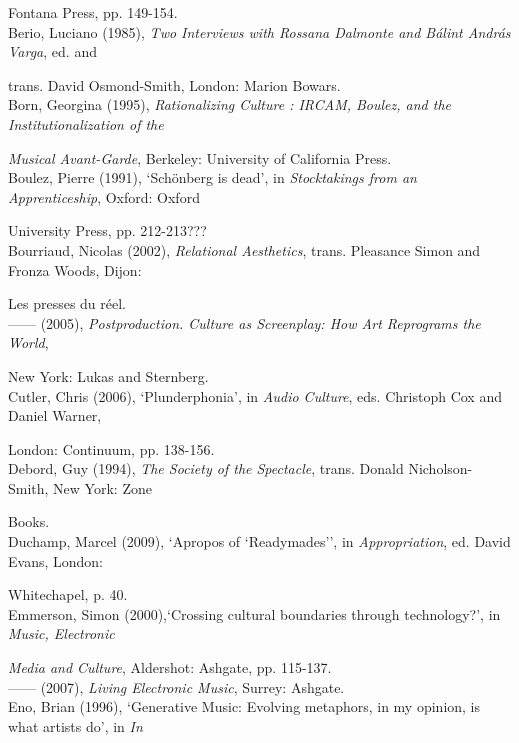 Fontana Press, pp. 149-154. 
\hypertarget{berio}{}\\
Berio, Luciano (1985), \emph{Two Interviews with Rossana Dalmonte and B\'{a}lint Andr\'{a}s Varga},  ed. and 

trans. David Osmond-Smith, London: Marion Bowars. 
\hypertarget{born}{}\\
Born, Georgina (1995), \emph{Rationalizing Culture : IRCAM, Boulez, and the Institutionalization of the}

\emph{Musical Avant-Garde}, Berkeley: University of California Press. 
\hypertarget{boulez}{}\\
Boulez, Pierre (1991), `Sch\"{o}nberg is dead', in \emph{Stocktakings from an Apprenticeship}, Oxford: Oxford 

University Press, pp. 212-213??? 
\hypertarget{relational}{}\\
Bourriaud, Nicolas (2002), \emph{Relational Aesthetics}, trans. Pleasance Simon and Fronza Woods, Dijon: 

Les presses du r\'{e}el.
\hypertarget{postproduction}{}\\
------ (2005),  \emph{Postproduction. Culture as Screenplay: How Art Reprograms the World}, 

New York: Lukas and Sternberg.
\hypertarget{cutler}{}\\
Cutler, Chris (2006),  `Plunderphonia', in \emph{Audio Culture}, eds. Christoph Cox and Daniel Warner, 

London: Continuum, pp. 138-156.
\hypertarget{debord}{}\\
Debord, Guy (1994), \emph{The Society of the Spectacle}, trans. Donald Nicholson-Smith, New York: Zone 

Books.
\hypertarget{duchamp}{}\\
Duchamp, Marcel (2009), `Apropos of `Readymades'', in \emph{Appropriation}, ed. David Evans, London: 

Whitechapel, p. 40.
\hypertarget{emmersoncross}{}\\
Emmerson, Simon (2000),`Crossing cultural boundaries through technology?',  in \emph{Music, Electronic}

\emph{Media and Culture}, Aldershot: Ashgate, pp. 115-137. 
\hypertarget{emmersonliving}{}\\
------ (2007), \emph{Living Electronic Music}, Surrey: Ashgate. 
\hypertarget{eno}{}\\
Eno, Brian (1996), `Generative Music: Evolving metaphors, in my opinion, is what artists do', in \emph{In}

